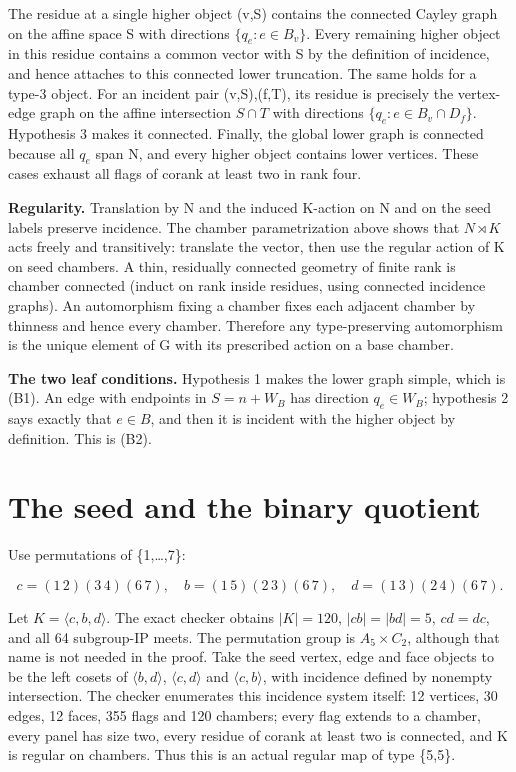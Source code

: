 The residue at a single higher object (v,S) contains the connected
Cayley graph on the affine space S with directions \(\{q_e:e\in B_v\}\).
Every remaining higher object in this residue contains a common vector
with S by the definition of incidence, and hence attaches to this
connected lower truncation. The same holds for a type-3 object. For an
incident pair (v,S),(f,T), its residue is precisely the vertex-edge
graph on the affine intersection \(S\cap T\) with directions
\(\{q_e:e\in B_v\cap D_f\}\). Hypothesis 3 makes it connected. Finally,
the global lower graph is connected because all \(q_e\) span N, and
every higher object contains lower vertices. These cases exhaust all
flags of corank at least two in rank four.

\textbf{Regularity.} Translation by N and the induced K-action on N and
on the seed labels preserve incidence. The chamber parametrization above
shows that \(N\rtimes K\) acts freely and transitively: translate the
vector, then use the regular action of K on seed chambers. A thin,
residually connected geometry of finite rank is chamber connected
(induct on rank inside residues, using connected incidence graphs). An
automorphism fixing a chamber fixes each adjacent chamber by thinness
and hence every chamber. Therefore any type-preserving automorphism is
the unique element of G with its prescribed action on a base chamber.

\textbf{The two leaf conditions.} Hypothesis 1 makes the lower graph
simple, which is (B1). An edge with endpoints in \(S=n+W_B\) has direction
\(q_e\in W_B\); hypothesis 2 says exactly that \(e\in B\), and then it
is incident with the higher object by definition. This is (B2).

\section{The seed and the binary
quotient}\label{the-seed-and-the-binary-quotient}

Use permutations of \{1,\ldots,7\}:

\[c=(1\,2)(3\,4)(6\,7),\quad b=(1\,5)(2\,3)(6\,7),\quad d=(1\,3)(2\,4)(6\,7).\]

Let \(K=\langle c,b,d\rangle\). The exact checker obtains
\(|K|=120\), \(|cb|=|bd|=5\),
\(cd=dc\), and all 64 subgroup-IP meets. The permutation group is
\(A_5\times C_2\), although that name is not needed in the proof. Take
the seed vertex, edge and face objects to be the left cosets of
\(\langle b,d\rangle\), \(\langle c,d\rangle\) and
\(\langle c,b\rangle\), with incidence defined by nonempty intersection.
The checker enumerates this incidence system itself: 12 vertices, 30
edges, 12 faces, 355 flags and 120 chambers; every flag extends to a
chamber, every panel has size two, every residue of corank at least two
is connected, and K is regular on chambers. Thus this is an actual
regular map of type \{5,5\}.

